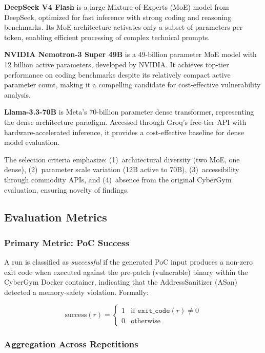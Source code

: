 \documentclass{ieeeaccess}
\begin{document}
\textbf{DeepSeek V4 Flash} is a large Mixture-of-Experts (MoE) model from DeepSeek, optimized for fast inference with strong coding and reasoning benchmarks. Its MoE architecture activates only a subset of parameters per token, enabling efficient processing of complex technical prompts.

\textbf{NVIDIA Nemotron-3 Super 49B} is a 49-billion parameter MoE model with 12 billion active parameters, developed by NVIDIA. It achieves top-tier performance on coding benchmarks despite its relatively compact active parameter count, making it a compelling candidate for cost-effective vulnerability analysis.

\textbf{Llama-3.3-70B} is Meta's 70-billion parameter dense transformer, representing the dense architecture paradigm. Accessed through Groq's free-tier API with hardware-accelerated inference, it provides a cost-effective baseline for dense model evaluation.

The selection criteria emphasize: (1)~architectural diversity (two MoE, one dense), (2)~parameter scale variation (12B active to 70B), (3)~accessibility through commodity APIs, and (4)~absence from the original CyberGym evaluation, ensuring novelty of findings.

\subsection{Evaluation Metrics}

\subsubsection{Primary Metric: PoC Success}

A run is classified as \emph{successful} if the generated PoC input produces a non-zero exit code when executed against the pre-patch (vulnerable) binary within the CyberGym Docker container, indicating that the AddressSanitizer (ASan) detected a memory-safety violation. Formally:

\begin{equation}
\text{success}(r) = \begin{cases} 1 & \text{if } \texttt{exit\_code}(r) \neq 0 \\ 0 & \text{otherwise} \end{cases}
\label{eq:success}
\end{equation}

\subsubsection{Aggregation Across Repetitions}
\end{document}
